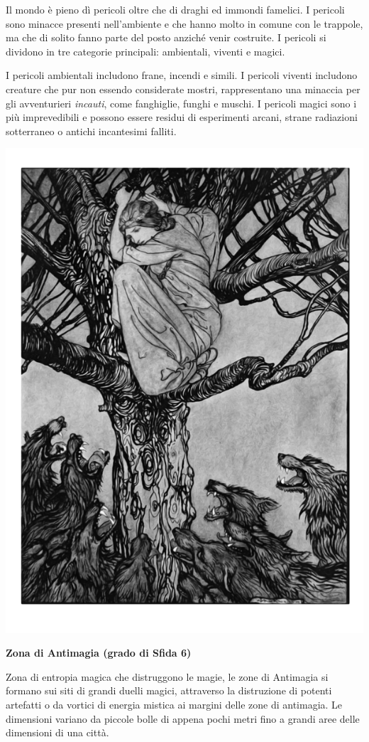 \begin{multicols}{2}

Il mondo è pieno dì pericoli oltre che di draghi ed immondi famelici. I pericoli sono minacce presenti nell'ambiente e che hanno molto in comune con le trappole, ma che di solito fanno parte del posto anziché venir costruite. I pericoli si dividono in tre categorie principali: ambientali, viventi e magici.

I pericoli ambientali includono frane, incendi e simili. I pericoli viventi includono creature che pur non essendo considerate mostri, rappresentano una minaccia per gli avventurieri \emph{incauti}, come fanghiglie, funghi e muschi. I pericoli magici sono i più imprevedibili e possono essere residui di esperimenti arcani, strane radiazioni sotterraneo o antichi incantesimi falliti.

\medskip

\begin{center}
\includegraphics[width=0.75\linewidth]{immagini/boscopericoli.png}
\end{center}

\textbf{Zona di Antimagia (grado di Sfida 6)}

Zona di entropia magica che distruggono le magie, le zone di Antimagia si formano sui siti di grandi duelli magici, attraverso la distruzione di potenti artefatti o da vortici di energia mistica ai margini delle zone di antimagia. Le dimensioni variano da piccole bolle di appena pochi metri fino a grandi aree delle dimensioni di una città.


\end{multicols}
